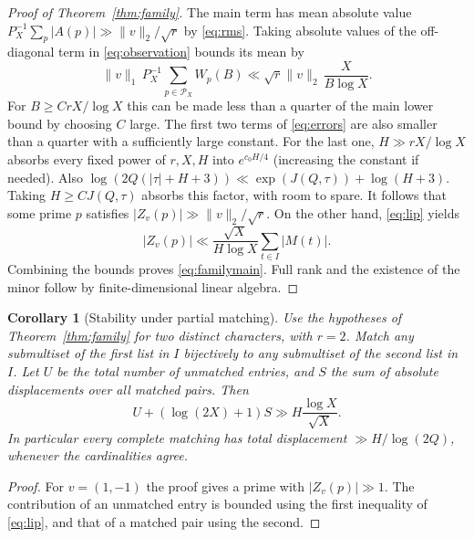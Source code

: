 \documentclass[11pt]{article}
\newtheorem{corollary}[theorem]{Corollary}
\newcommand{\calP}{\mathcal P}\newcommand{\wh}{\widehat}
\begin{document}
\begin{proof}[Proof of Theorem~\ref{thm:family}]
The main term has mean absolute value
$P_X^{-1}\sum_p|A(p)|\gg\|v\|_2/\sqrt r$ by \eqref{eq:rms}.
Taking absolute values of the off-diagonal term in \eqref{eq:observation}
bounds its mean by
\[
 \|v\|_1\,P_X^{-1}\sum_{p\in\calP_X}W_p(B)
 \ll\sqrt r\|v\|_2\,\frac{X}{B\log X}.
\]
For $B\ge C r X/\log X$ this can be made less than a quarter of the main
lower bound by choosing $C$ large. The first two terms of \eqref{eq:errors}
are also smaller than a quarter with a sufficiently large constant.
For the last one, $H\gg rX/\log X$ absorbs every fixed power of
$r,X,H$ into $e^{c_0 H/4}$ (increasing the constant if needed).
Also $\log(2Q(|\tau|+H+3))\ll \exp(J(Q,\tau))+\log(H+3)$.
Taking $H\ge C J(Q,\tau)$ absorbs this factor, with room to spare.
It follows that some prime $p$ satisfies
$|Z_v(p)|\gg\|v\|_2/\sqrt r$.
On the other hand, \eqref{eq:lip} yields
\[
 |Z_v(p)|\ll \frac{\sqrt X}{H\log X}\sum_{t\in I}|M(t)|.
\]
Combining the bounds proves \eqref{eq:familymain}. Full rank and the
existence of the minor follow by finite-dimensional linear algebra.
\end{proof}

\begin{corollary}[Stability under partial matching]\label{cor:match}
Use the hypotheses of Theorem~\ref{thm:family} for two distinct characters,
with $r=2$. Match any submultiset of the first list in $I$ bijectively to
any submultiset of the second list in $I$. Let $U$ be the total number
of unmatched entries, and $S$ the sum of absolute displacements over all
matched pairs. Then
\[
 U+(\log(2X)+1)S\gg H\frac{\log X}{\sqrt X}.
\]
In particular every complete matching has total displacement
$\gg H/\log(2Q)$, whenever the cardinalities agree.
\end{corollary}
\begin{proof}
For $v=(1,-1)$ the proof gives a prime with $|Z_v(p)|\gg1$.
The contribution of an unmatched entry is bounded using the first
inequality of \eqref{eq:lip}, and that of a matched pair using the second.
\end{proof}
\end{document}
